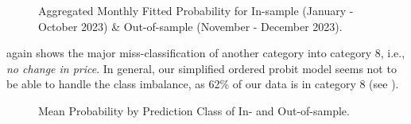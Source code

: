 \begin{figure}[H]
    \centering
    \caption{Aggregated Monthly Fitted Probability for In-sample (January - October 2023) \& Out-of-sample (November - December 2023).}
    \label{fig:figure-4}
\end{figure}

 again shows the major miss-classification of another category into category 8, i.e., \textit{no change in price}. In general, our simplified ordered probit model seems not to be able to handle the class imbalance, as 62\% of our data is in category 8 (see ).

\begin{figure}[H]
    \centering
    \caption{Mean Probability by Prediction Class of In- and Out-of-sample.}
    \label{fig:figure-5}
\end{figure}